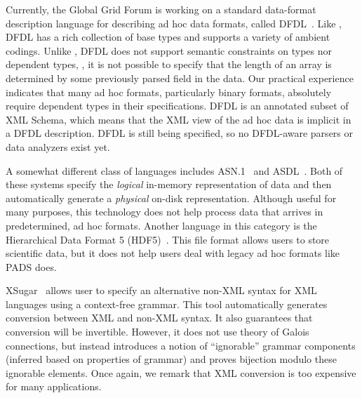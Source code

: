 Currently, the Global Grid Forum is working on a standard
data-format description language for describing ad hoc data formats,
called DFDL~\cite{dfdl-proposal,dfdl-primer}.  Like \pads{},
DFDL{} has a rich collection of base types and supports a variety of
ambient codings.  Unlike \pads{}, DFDL{} does not support semantic
constraints on types nor dependent types, \eg{}, it is not possible to
specify that the length of an array is determined by some previously parsed field in the
data.  Our practical experience indicates that many ad hoc formats,
particularly binary formats, absolutely require dependent types in their
specifications.  DFDL{} is an annotated subset of XML{} Schema, which means
that the XML{} view of the ad hoc data is implicit in a DFDL{}
description.  DFDL{} is still being specified, so no DFDL-aware
parsers or data analyzers exist yet.  


A somewhat different class of languages includes
\textsc{ASN.1}~\cite{asn} and \textsc{ASDL}~\cite{asdl}.  Both of
these systems specify the {\em logical\/} in-memory representation of
data and then automatically generate a {\em physical\/} on-disk
representation.  Although useful for many purposes, this technology
does not help process data that arrives in predetermined, ad hoc
formats.  Another language in this category is the Hierarchical Data
Format 5 (HDF5)~\cite{hdf5}.  This file format allows users to store
scientific data, but it does not help users deal with legacy ad hoc
formats like PADS does.


XSugar~\cite{brabrand+:xsugar2005} allows user to specify an
alternative non-XML syntax for XML languages using a context-free
grammar.  This tool automatically generates conversion between XML and
non-XML syntax. It also guarantees that conversion will be invertible.
However, it does not use theory of Galois connections, but instead
introduces a notion of ``ignorable'' grammar components (inferred
based on properties of grammar) and proves bijection modulo these
ignorable elements.  Once again, we remark that XML conversion is
too expensive for many applications.

